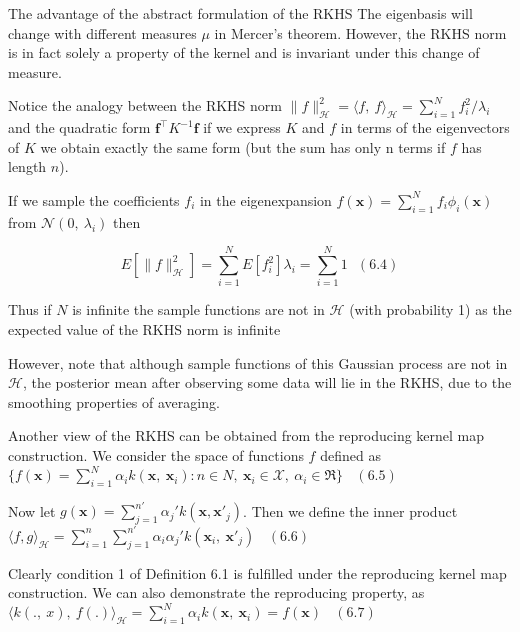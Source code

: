 \documentclass[
  ignorenonframetext,
]{beamer}
\begin{document}
\begin{frame}{The advantage of the abstract formulation of the RKHS}
\protect\hypertarget{the-advantage-of-the-abstract-formulation-of-the-rkhs}{}
The eigenbasis will change with different measures \(\mu\) in Mercer's
theorem. However, the RKHS norm is in fact solely a property of the
kernel and is invariant under this change of measure.

Notice the analogy between the RKHS norm
\(\|f\|^2 _{\mathcal H} = \langle f,\ f\rangle_{\mathcal H}= \sum^N_{i=1}f_i^2/\lambda_i\)
and the quadratic form \(\pmb f^{\top} K^{-1} \pmb f\) if we express
\(K\) and \(f\) in terms of the eigenvectors of \(K\) we obtain exactly
the same form (but the sum has only n terms if \(f\) has length \(n\)).
\end{frame}

\begin{frame}{}
\protect\hypertarget{section-2}{}
If we sample the coefficients \(f_i\) in the eigenexpansion
\(f(\pmb x) = \sum^N_{i=1}f_i\phi_i(\pmb x)\) from
\(\mathcal N (0,\ \lambda_i)\) then

\[
E[\|f\|^2_{\mathcal H}] = \sum_{i=1}^N E[f_i^2] \lambda_i = \sum_{i=1}^N 1 \ \ \ (6.4)
\]

Thus if \(N\) is infinite the sample functions are not in \(\mathcal H\)
(with probability 1) as the expected value of the RKHS norm is infinite

However, note that although sample functions of this Gaussian process
are not in \(\mathcal H\), the posterior mean after observing some data
will lie in the RKHS, due to the smoothing properties of averaging.
\end{frame}

\begin{frame}{}
\protect\hypertarget{section-3}{}
Another view of the RKHS can be obtained from the reproducing kernel map
construction. We consider the space of functions \(f\) defined as
\(\{ f(\pmb x) = \sum_{i=1}^N \alpha_i k(\pmb x,\ \pmb x_i) : n \in N,\ \pmb x_i \in \mathcal X ,\ \alpha_i \in \mathfrak R\}\ \ \ \ (6.5)\)

Now let \(g(\pmb x) = \sum_{j=1}^{n'} \alpha_j' k(\pmb x, \pmb x'_j)\).
Then we define the inner product
\(\langle f, g\rangle_{\mathcal H}= \sum_{i=1}^n \sum_{j =1}^{n'} \alpha_i\alpha_j' k(\pmb x_i,\  \pmb x'_j)\ \ \ \ (6.6)\)

Clearly condition 1 of Definition 6.1 is fulfilled under the reproducing
kernel map construction. We can also demonstrate the reproducing
property, as
\(\langle k(.,\ x),\ f(.)\rangle_{\mathcal H}= \sum_{i=1}^N \alpha_ik(\pmb x,\ \pmb x_i) = f(\pmb x) \ \ \ \ (6.7)\)
\end{frame}
\end{document}
